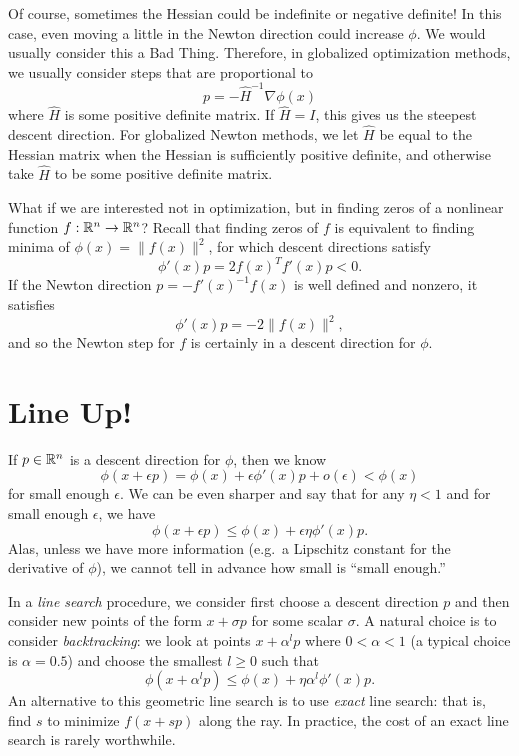 \documentclass[12pt, leqno]{article} %
\begin{document}
Of course, sometimes the Hessian could be indefinite or negative
definite!  In this case, even moving a little in the Newton direction
could increase $\phi$.  We would usually consider this a Bad Thing.
Therefore, in globalized optimization methods, we usually consider
steps that are proportional to
\[
  p = -\hat{H}^{-1} \nabla \phi(x)
\]
where $\hat{H}$ is some positive definite matrix.  If $\hat{H} = I$,
this gives us the steepest descent direction.  For globalized Newton
methods, we let $\hat{H}$ be equal to the Hessian matrix when the
Hessian is sufficiently positive definite, and otherwise take
$\hat{H}$ to be some positive definite matrix.

What if we are interested not in optimization, but in finding zeros
of a nonlinear function $f : \mathbb{R}^n \rightarrow \mathbb{R}^n$?
Recall that finding zeros of $f$ is equivalent to finding
minima of $\phi(x) = \|f(x)\|^2$, for which descent directions satisfy
\[
  \phi'(x) p = 2 f(x)^T f'(x) p < 0.
\]
If the Newton direction $p = -f'(x)^{-1} f(x)$ is well
defined and nonzero, it satisfies
\[
  \phi'(x) p = -2 \|f(x)\|^2,
\]
and so the Newton step for $f$ is certainly in a descent direction
for $\phi$.

\section*{Line Up!}

If $p \in \mathbb{R}^n$ is a descent direction for $\phi$, then we know
\[
  \phi(x + \epsilon p) = \phi(x) + \epsilon \phi'(x) p + o(\epsilon) < \phi(x)
\]
for small enough $\epsilon$.  We can be even sharper and say that for
any $\eta < 1$ and for small enough $\epsilon$, we have
\[
  \phi(x+\epsilon p) \leq \phi(x) + \epsilon \eta \phi'(x) p.
\]
Alas, unless we have more information (e.g.~a Lipschitz constant for
the derivative of $\phi$), we cannot tell in advance how small is
``small enough.''

In a {\em line search} procedure, we consider first choose a descent
direction $p$ and then consider new points of the form $x + \sigma p$
for some scalar $\sigma$.  A natural choice is to consider {\em
  backtracking}: we look at points $x + \alpha^l p$ where
$0 < \alpha < 1$ (a typical choice is $\alpha = 0.5$) and choose the
smallest $l \geq 0$ such that
\[
  \phi(x + \alpha^l p) \leq \phi(x) + \eta \alpha^l \phi'(x) p.
\]
An alternative to this geometric line search is to use {\em exact}
line search: that is, find $s$ to minimize $f(x+sp)$ along the ray.
In practice, the cost of an exact line search is rarely worthwhile.
\end{document}
